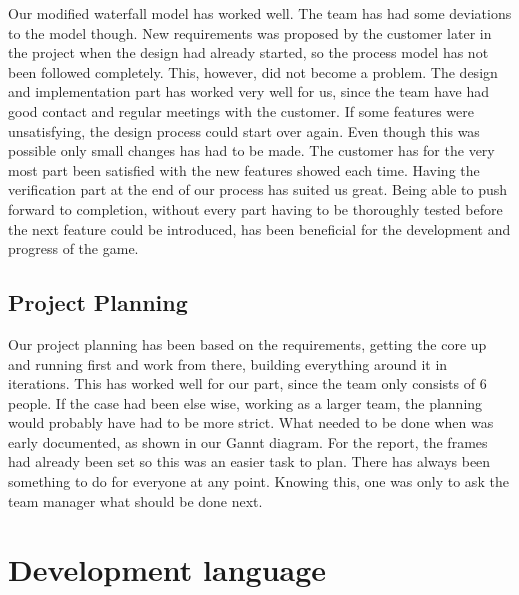 Our modified waterfall model has worked well. The team has had some deviations to the model though. New requirements was
proposed by the customer later in the project when the design had already started, so the process model has not been followed
completely. This, however, did not become a problem. The design and implementation part has worked very well for us, since the 
team have had good contact and regular meetings with the customer. If some features were unsatisfying, the design process could 
start over again. Even though this was possible only small changes has had to be made. The customer has for the very most part 
been satisfied with the new features showed each time. Having the verification part at the end of our process has suited us 
great. Being able to push forward to completion, without every part having to be thoroughly tested before the next feature 
could be introduced, has been beneficial for the development and progress of the game. 

\subsection{Project Planning}

Our project planning has been based on the requirements, getting the core up and running first and work from there, building 
everything around it in iterations. This has worked well for our part, since the team only consists of 6 people. If the case 
had been else wise, working as a larger team, the planning would probably have had to be more strict. What needed to be done 
when was early documented, as shown in our Gannt diagram. For the report, the frames had already been set so this was an easier 
task to plan. There has always been something to do for everyone at any point. Knowing this, one was only to ask the team manager what should be done next.


\section{Development language}

